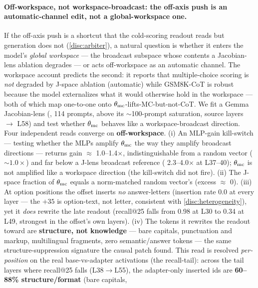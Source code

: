 \paragraph{Off-workspace, not workspace-broadcast: the off-axis push is an
automatic-channel edit, not a global-workspace one.}
If the off-axis push is a shortcut that the cold-scoring readout reads but
generation does not (\cref{disc:arbiter}), a natural question is whether it enters
the model's \emph{global workspace} --- the broadcast subspace whose contents a
Jacobian-lens ablation degrades --- or acts off-workspace as an automatic channel.
The workspace account \citep{GlobalWorkspace} predicts the second: it reports that
multiple-choice scoring is \emph{not} degraded by J-space ablation (automatic)
while GSM8K-CoT is robust because the model externalizes what it would otherwise
hold in the workspace --- both of which map one-to-one onto
$\theta_{\mathrm{mc}}$-lifts-MC-but-not-CoT. We fit a Gemma Jacobian-lens
(, 114 prompts, above its ${\sim}$100-prompt
saturation, source layers $\rightarrow$ L58) and test whether $\theta_{\mathrm{mc}}$ behaves
like a workspace-broadcast direction. Four independent reads converge on
\textbf{off-workspace}. (i) An MLP-gain kill-switch --- testing whether the MLPs
amplify $\theta_{\mathrm{mc}}$ the way they amplify broadcast directions --- returns gain
${\approx}$ 1.0--1.4$\times$, indistinguishable from a random vector
(${\sim}1.0\times$) and far below a J-lens broadcast reference
( 2.3--4.0$\times$ at L37--40); $\theta_{\mathrm{mc}}$ is not
amplified like a workspace direction (the kill-switch did not fire). (ii) The
J-space fraction of $\theta_{\mathrm{mc}}$ equals a norm-matched random vector's (excess
${\approx}$ 0). (iii) At option positions the offset inserts \emph{no}
answer-letters (insertion rate 0.0 at every layer --- the $+35$ is option-text, not
letter, consistent with \cref{disc:heterogeneity}), yet it \emph{does} rewrite the
late readout (recall@25 falls from 0.98 at L30 to 0.34 at L49, strongest in the
offset's own layers). (iv) The tokens it rewrites the readout toward are
\textbf{structure, not knowledge} --- bare capitals, punctuation and markup,
multilingual fragments, zero semantic/answer tokens --- the same
structure-suppression signature the causal patch found. This read is resolved
\emph{per-position} on the real base-vs-adapter activations (the recall-tail):
across the tail layers where recall@25 falls (L38${\rightarrow}$L55), the
adapter-only inserted ids are \textbf{60--88\% structure/format} (bare capitals,

